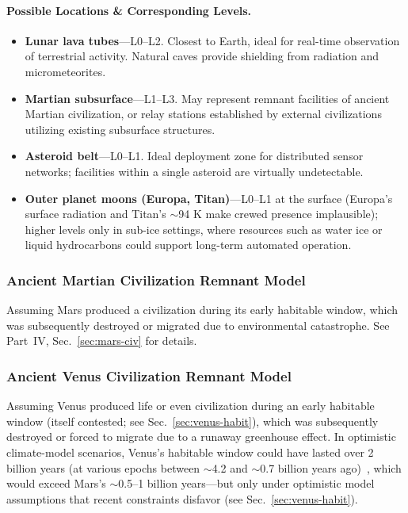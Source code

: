 \documentclass[aps,prd,twocolumn,superscriptaddress,nofootinbib]{revtex4-2}
\begin{document}
\paragraph{Possible Locations \& Corresponding Levels.}

\begin{itemize}
  \item \textbf{Lunar lava tubes}---L0--L2. Closest to Earth, ideal for real-time observation of terrestrial activity. Natural caves provide shielding from radiation and micrometeorites.
  \item \textbf{Martian subsurface}---L1--L3. May represent remnant facilities of ancient Martian civilization, or relay stations established by external civilizations utilizing existing subsurface structures.
  \item \textbf{Asteroid belt}---L0--L1. Ideal deployment zone for distributed sensor networks; facilities within a single asteroid are virtually undetectable.
  \item \textbf{Outer planet moons (Europa, Titan)}---L0--L1 at the surface (Europa's surface radiation and Titan's ${\sim}$94 K make crewed presence implausible); higher levels only in sub-ice settings, where resources such as water ice or liquid hydrocarbons could support long-term automated operation.
\end{itemize}

\subsubsection{Ancient Martian Civilization Remnant Model}\label{sec:mars-remnant}

Assuming Mars produced a civilization during its early habitable window, which was subsequently destroyed or migrated due to environmental catastrophe. See Part~IV, Sec.~\ref{sec:mars-civ} for details.

\subsubsection{Ancient Venus Civilization Remnant Model}\label{sec:venus-remnant}

Assuming Venus produced life or even civilization during an early habitable window (itself contested; see Sec.~\ref{sec:venus-habit}), which was subsequently destroyed or forced to migrate due to a runaway greenhouse effect. In optimistic climate-model scenarios, Venus's habitable window could have lasted over 2 billion years (at various epochs between ${\sim}$4.2 and ${\sim}$0.7 billion years ago)~\cite{Way2016,Way2020}, which would exceed Mars's ${\sim}$0.5--1 billion years---but only under optimistic model assumptions that recent constraints disfavor (see Sec.~\ref{sec:venus-habit}).
\end{document}
